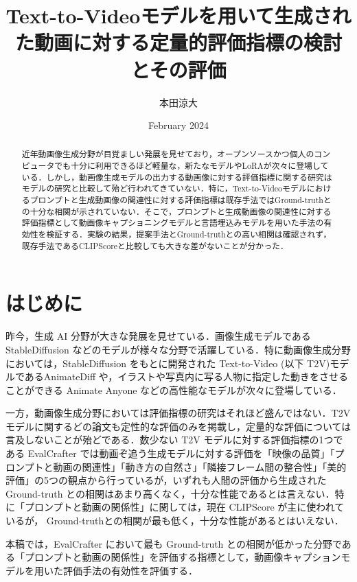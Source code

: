 \documentclass[10pt]{article}
\title{Text-to-Videoモデルを用いて生成された動画に対する定量的評価指標の検討とその評価}
\author{本田涼大}
\date{February 2024}
\begin{document}
\maketitle

\begin{abstract}
    近年動画像生成分野が目覚ましい発展を見せており，オープンソースかつ個人のコンピュータでも十分に利用できるほど軽量な，新たなモデルやLoRAが次々に登場している．しかし，動画像生成モデルの出力する動画像に対する評価指標に関する研究はモデルの研究と比較して殆ど行われてきていない．特に，Text-to-Videoモデルにおけるプロンプトと生成動画像の関連性に対する評価指標は既存手法ではGround-truthとの十分な相関が示されていない．そこで，プロンプトと生成動画像の関連性に対する評価指標として動画像キャプショニングモデルと言語埋込みモデルを用いた手法の有効性を検証する．実験の結果，提案手法とGround-truthとの高い相関は確認されず，既存手法であるCLIPScoreと比較しても大きな差がないことが分かった．
\end{abstract}

\section{はじめに}

昨今，生成 AI 分野が大きな発展を見せている．画像生成モデルである StableDiffusion \cite{rombach2022high} などのモデルが様々な分野で活躍している．特に動画像生成分野においては，StableDiffusion をもとに開発された Text-to-Video (以下 T2V)モデルであるAnimateDiff \cite{guo2023animatediff} や，イラストや写真内に写る人物に指定した動きをさせることができる Animate Anyone \cite{hu2023animate} などの高性能なモデルが次々に登場している．

一方，動画像生成分野においては評価指標の研究はそれほど盛んではない．T2V モデルに関するどの論文も定性的な評価のみを掲載し，定量的な評価については言及しないことが殆どである．数少ない T2V モデルに対する評価指標の1つである EvalCrafter \cite{liu2023evalcrafter} では動画ぞ追う生成モデルに対する評価を「映像の品質」「プロンプトと動画の関連性」「動き方の自然さ」「隣接フレーム間の整合性」「美的評価」の5つの観点から行っているが，いずれも人間の評価から生成された Ground-truth との相関はあまり高くなく，十分な性能であるとは言えない．特に「プロンプトと動画の関係性」に関しては，現在 CLIPScore \cite{hessel2021clipscore} が主に使われているが， Ground-truthとの相関が最も低く，十分な性能があるとはいえない．

本稿では，EvalCrafter において最も Ground-truth との相関が低かった分野である「プロンプトと動画の関係性」を評価する指標として，動画像キャプションモデルを用いた評価手法の有効性を評価する．
\end{document}
